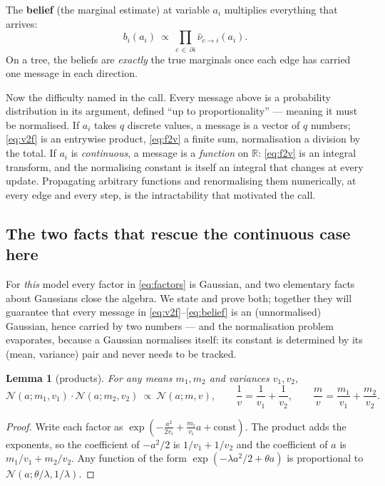 \documentclass[11pt]{article}
\newtheorem{lemma}{Lemma}
\theoremstyle{definition}
\theoremstyle{remark}
\newcommand{\R}{\mathbb{R}}
\newcommand{\N}{\mathcal{N}}
\begin{document}
The \textbf{belief} (the marginal estimate) at variable $a_i$ multiplies
everything that arrives:
\begin{equation}\label{eq:belief}
  b_i(a_i)\ \propto\ \prod_{c\,\in\,\partial i}\hat\nu_{c\to i}(a_i) .
  \tag{SP3}
\end{equation}
On a tree, the beliefs are \emph{exactly} the true marginals once each edge
has carried one message in each direction.

Now the difficulty named in the call. Every message above is a probability
distribution in its argument, defined ``up to proportionality'' --- meaning
it must be normalised. If $a_i$ takes $q$ discrete values, a message is a
vector of $q$ numbers; \eqref{eq:v2f} is an entrywise product,
\eqref{eq:f2v} a finite sum, normalisation a division by the total. If
$a_i$ is \emph{continuous}, a message is a \emph{function} on $\R$:
\eqref{eq:f2v} is an integral transform, and the normalising constant is
itself an integral that changes at every update. Propagating arbitrary
functions and renormalising them numerically, at every edge and every step,
is the intractability that motivated the call.

\subsection{The two facts that rescue the continuous case here}
\label{sec:lemmas}

For \emph{this} model every factor in \eqref{eq:factors} is Gaussian, and
two elementary facts about Gaussians close the algebra. We state and prove
both; together they will guarantee that every message in
\eqref{eq:v2f}--\eqref{eq:belief} is an (unnormalised) Gaussian, hence
carried by two numbers --- and the normalisation problem evaporates, because
a Gaussian normalises itself: its constant is determined by its (mean,
variance) pair and never needs to be tracked.

\begin{lemma}[products]\label{lem:prod}
For any means $m_1,m_2$ and variances $v_1,v_2$,
\[
  \N(a;m_1,v_1)\cdot\N(a;m_2,v_2)\ \propto\ \N(a;m,v),
  \qquad
  \frac1v=\frac1{v_1}+\frac1{v_2},
  \qquad
  \frac mv=\frac{m_1}{v_1}+\frac{m_2}{v_2} .
\]
\end{lemma}
\begin{proof}
Write each factor as $\exp(-\frac{a^2}{2v_i}+\frac{m_i}{v_i}a+\text{const})$.
The product adds the exponents, so the coefficient of $-a^2/2$ is
$1/v_1+1/v_2$ and the coefficient of $a$ is $m_1/v_1+m_2/v_2$. Any function
of the form $\exp(-\lambda a^2/2+\theta a)$ is proportional to
$\N(a;\theta/\lambda,1/\lambda)$.
\end{proof}
\end{document}

